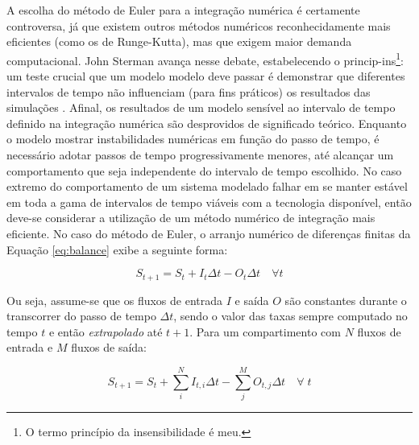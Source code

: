 \documentclass[./main.tex]{subfiles}
\begin{document}
\par A escolha do método de Euler para a integração numérica é certamente controversa, já que existem outros métodos numéricos reconhecidamente mais eficientes (como os de Runge-Kutta), mas que exigem maior demanda computacional. John Sterman avança nesse debate, estabelecendo o \gls{princip-ins}\footnote{O termo princípio da insensibilidade é meu.}: um teste crucial que um modelo modelo deve passar é demonstrar que diferentes intervalos de tempo não influenciam (para fins práticos) os resultados das simulações \cite{sterman2000}. Afinal, os resultados de um modelo sensível ao intervalo de tempo definido na integração numérica são desprovidos de significado teórico. Enquanto o modelo mostrar instabilidades numéricas em função do passo de tempo, é necessário adotar passos de tempo progressivamente menores, até alcançar um comportamento que seja independente do intervalo de tempo escolhido. No caso extremo do comportamento de um sistema modelado falhar em se manter estável em toda a gama de intervalos de tempo viáveis com a tecnologia disponível, então deve-se considerar a utilização de um método numérico de integração mais eficiente. No caso do método de Euler, o arranjo numérico de diferenças finitas da Equação \eqref{eq:balance} exibe a seguinte forma:
\begin{linenomath*}
\begin{equation} 
	\label{eq:balance_numeric}
	S_{t+1} = S_{t} + I_{t}\Delta t - O_{t}\Delta t \quad \forall t
\end{equation}
\end{linenomath*}
Ou seja, assume-se que os fluxos de entrada $I$ e saída $O$ são constantes durante o transcorrer do passo de tempo $\Delta t$, sendo o valor das taxas sempre computado no tempo $t$ e então \textit{extrapolado} até $t+1$. Para um compartimento com $N$ fluxos de entrada e $M$ fluxos de saída:
\begin{linenomath*}
\begin{equation} 
	\label{eq:balance_numeric_expanded}
	S_{t+1} = S_{t} + \sum_{i}^{N} I_{t, i}\Delta t - \sum_{j}^{M}O_{t, j}\Delta t \quad \forall \; t
\end{equation}
\end{linenomath*}
\end{document}
